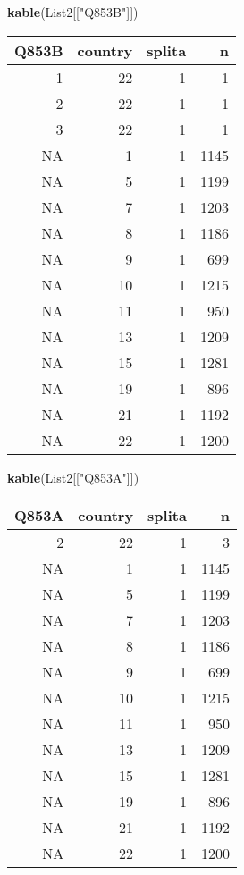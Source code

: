 \documentclass[]{article}
\newenvironment{Shaded}{\begin{snugshade}}{\end{snugshade}}
\newcommand{\KeywordTok}[1]{\textcolor[rgb]{0.13,0.29,0.53}{\textbf{#1}}}
\newcommand{\NormalTok}[1]{#1}
\newcommand{\StringTok}[1]{\textcolor[rgb]{0.31,0.60,0.02}{#1}}
\begin{document}
\begin{Shaded}
\begin{Highlighting}[]
\KeywordTok{kable}\NormalTok{(List2[[}\StringTok{"Q853B"}\NormalTok{]])}
\end{Highlighting}
\end{Shaded}

\begin{tabular}{r|r|r|r}
\hline
Q853B & country & splita & n\\
\hline
1 & 22 & 1 & 1\\
\hline
2 & 22 & 1 & 1\\
\hline
3 & 22 & 1 & 1\\
\hline
NA & 1 & 1 & 1145\\
\hline
NA & 5 & 1 & 1199\\
\hline
NA & 7 & 1 & 1203\\
\hline
NA & 8 & 1 & 1186\\
\hline
NA & 9 & 1 & 699\\
\hline
NA & 10 & 1 & 1215\\
\hline
NA & 11 & 1 & 950\\
\hline
NA & 13 & 1 & 1209\\
\hline
NA & 15 & 1 & 1281\\
\hline
NA & 19 & 1 & 896\\
\hline
NA & 21 & 1 & 1192\\
\hline
NA & 22 & 1 & 1200\\
\hline
\end{tabular}

\begin{Shaded}
\begin{Highlighting}[]
\KeywordTok{kable}\NormalTok{(List2[[}\StringTok{"Q853A"}\NormalTok{]])}
\end{Highlighting}
\end{Shaded}

\begin{tabular}{r|r|r|r}
\hline
Q853A & country & splita & n\\
\hline
2 & 22 & 1 & 3\\
\hline
NA & 1 & 1 & 1145\\
\hline
NA & 5 & 1 & 1199\\
\hline
NA & 7 & 1 & 1203\\
\hline
NA & 8 & 1 & 1186\\
\hline
NA & 9 & 1 & 699\\
\hline
NA & 10 & 1 & 1215\\
\hline
NA & 11 & 1 & 950\\
\hline
NA & 13 & 1 & 1209\\
\hline
NA & 15 & 1 & 1281\\
\hline
NA & 19 & 1 & 896\\
\hline
NA & 21 & 1 & 1192\\
\hline
NA & 22 & 1 & 1200\\
\hline
\end{tabular}
\end{document}
